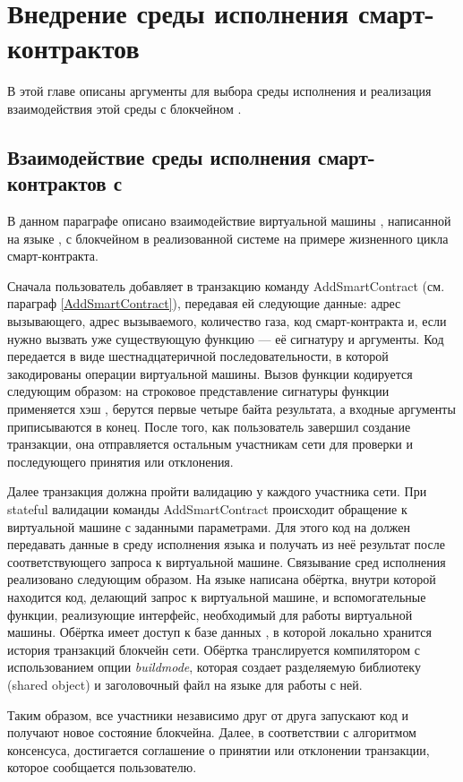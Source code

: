 \section{Внедрение среды исполнения смарт-кон\-трак\-тов}
В этой главе описаны аргументы для выбора среды исполнения и реализация взаимодействия этой среды с блокчейном .

\subsection{Взаимодействие среды исполнения смарт-кон\-трак\-тов с }
В данном параграфе описано взаимодействие виртуальной машины , написанной на языке , с блокчейном  в реализованной системе на примере жизненного цикла смарт-контракта.

Сначала пользователь добавляет в транзакцию команду Add\-Smart\-Con\-tract (см. па\-ра\-граф \ref{AddSmartContract}), передавая ей следующие данные: адрес вызывающего, адрес вызываемого, количество газа, код смарт-кон\-тракта и, если нужно вызвать уже существующую функцию --- её сигнатуру и аргументы.
Код передается в виде шестнадцатеричной последовательности, в которой закодированы  операции виртуальной машины.
Вызов функции кодируется следующим образом: на строковое представление сигнатуры функции применяется хэш , берутся первые четыре байта результата, а входные аргументы приписываются в конец.
После того, как пользователь завершил создание транзакции, она отправляется остальным участникам сети для проверки и последующего принятия или отклонения.

Далее транзакция должна пройти валидацию у каждого участника сети.
При stateful валидации команды Add\-Smart\-Con\-tract происходит обращение к виртуальной машине  с заданными параметрами.
Для этого код на  должен передавать данные в среду исполнения языка  и получать из неё результат после соответствующего запроса к виртуальной машине.
Связывание сред исполнения реализовано следующим образом.
На языке  написана обёртка, внутри которой находится код, делающий запрос к  виртуальной машине, и вспомогательные функции, реализующие интерфейс, необходимый для работы виртуальной машины.
Обёртка имеет доступ к базе данных , в которой локально хранится история транзакций блокчейн сети.
Обёртка транслируется компилятором  с использованием опции \emph{buildmode}, которая создает разделяемую библиотеку (shared object) и заголовочный файл на языке  для работы с ней.

Таким образом, все участники независимо друг от друга запускают код и получают новое состояние блокчейна.
Далее, в соответствии с алгоритмом консенсуса, достигается соглашение о принятии или отклонении транзакции, которое сообщается пользователю.
